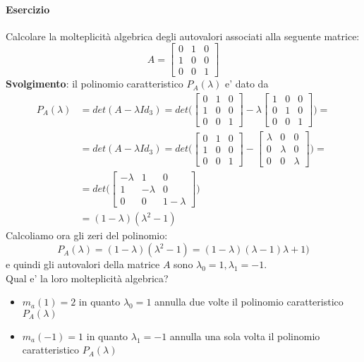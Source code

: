 \documentclass[a4paper, 10pt]{article}
\begin{document}
	\paragraph*{Esercizio}
	Calcolare la molteplicità algebrica degli autovalori associati alla seguente matrice:
	\[ A = \begin{bmatrix} 0 & 1 & 0 \\ 1 & 0 & 0 \\ 0 & 0 & 1 \end{bmatrix} \]
	\textbf{Svolgimento}: il polinomio caratteristico $P_A(\lambda)$ e' dato da
	\begin{equation*}
		\begin{split}
		 P_A(\lambda) &= det(A - \lambda Id_3) = det \biggl( \begin{bmatrix} 0 & 1 & 0 \\ 1 & 0 & 0 \\ 0 & 0 & 1 \end{bmatrix}
		 - \lambda \begin{bmatrix} 1 & 0 & 0 \\ 0 & 1 & 0 \\ 0 & 0 & 1 \end{bmatrix} \biggr) = \\
		 &= det(A - \lambda Id_3) = det \biggl( \begin{bmatrix} 0 & 1 & 0 \\ 1 & 0 & 0 \\ 0 & 0 & 1 \end{bmatrix}
		 -  \begin{bmatrix}  \lambda& 0 & 0 \\ 0 & \lambda & 0 \\ 0 & 0 & \lambda \end{bmatrix} \biggr) = \\
		 &= det \biggl( \begin{bmatrix} -\lambda & 1 & 0 \\ 1 & -\lambda & 0 \\ 0 & 0 & 1 - \lambda \end{bmatrix} \biggr) \\
		&= (1 - \lambda) (\lambda^2 - 1) 
		\end{split}
	\end{equation*}
	Calcoliamo ora gli zeri del polinomio:
	\[ P_A(\lambda) = (1 - \lambda) (\lambda^2 - 1) = (1 - \lambda)(\lambda -1)\lambda + 1) \]
	e quindi gli autovalori della matrice $A$ sono $\lambda_0 = 1, \lambda_1 = -1$. \\
	Qual e' la loro molteplicità algebrica?
	\begin{itemize}
		\item $m_a(1) = 2$ in quanto $\lambda_0 = 1$ annulla due volte il polinomio caratteristico $P_A(\lambda)$
		\item $m_a(-1) = 1$ in quanto $\lambda_1 = -1$ annulla una sola volta il polinomio caratteristico $P_A(\lambda)$
	\end{itemize}
\end{document}
